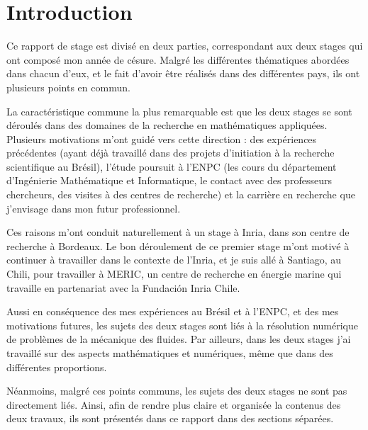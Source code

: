 \section{Introduction}

\indent Ce rapport de stage est divisé en deux parties, correspondant aux deux stages qui ont composé mon année de césure. Malgré les différentes thématiques abordées dans chacun d'eux, et le fait d'avoir être réalisés dans des différentes pays, ils ont plusieurs points en commun.

\indent La caractéristique commune la plus remarquable est que les deux stages se sont déroulés dans des domaines de la recherche en mathématiques appliquées. Plusieurs motivations m'ont guidé vers cette direction : des expériences précédentes (ayant déjà travaillé dans des projets d'initiation à la recherche scientifique au Brésil), l'étude poursuit à l'ENPC (les cours du département d’Ingénierie Mathématique et Informatique, le contact avec des professeurs chercheurs, des visites à des centres de recherche) et la carrière en recherche que j'envisage dans mon futur professionnel.

\indent Ces raisons m'ont conduit naturellement à un stage à Inria, dans son centre de recherche à Bordeaux. Le bon déroulement de ce premier stage m'ont motivé à continuer à travailler dans le contexte de l'Inria, et je suis allé à Santiago, au Chili, pour travailler à MERIC, un centre de recherche en énergie marine qui travaille en partenariat avec la Fundación Inria Chile.

\indent Aussi en conséquence des mes expériences au Brésil et à l'ENPC, et des mes motivations futures, les sujets des deux stages sont liés à la résolution numérique de problèmes de la mécanique des fluides. Par ailleurs, dans les deux stages j'ai travaillé sur des aspects mathématiques et numériques, même que dans des différentes proportions. 

\indent Néanmoins, malgré ces points communs, les sujets des deux stages ne sont pas directement liés. Ainsi, afin de rendre plus claire et organisée la contenus des deux travaux, ils sont présentés dans ce rapport dans des sections séparées.